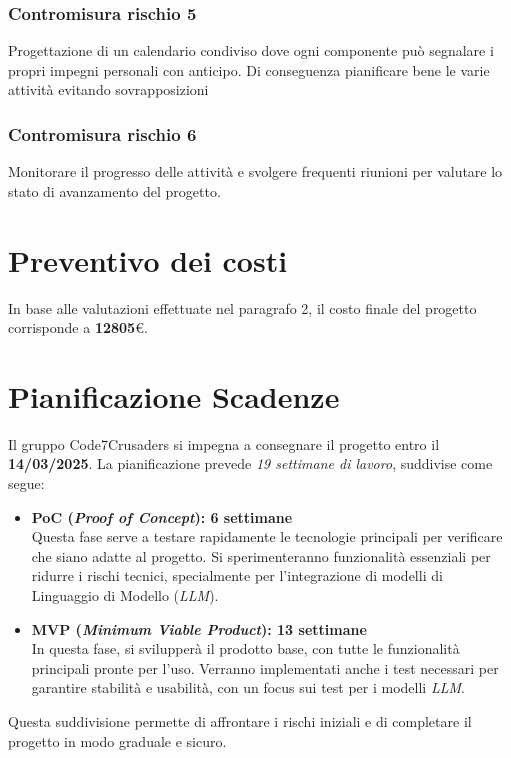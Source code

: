 \documentclass{article}
\begin{document}
\subsubsection{Contromisura rischio 5}
Progettazione di un calendario condiviso dove ogni componente può segnalare i propri impegni personali con anticipo. Di conseguenza pianificare bene le varie attività evitando sovrapposizioni
\subsubsection{Contromisura rischio 6}
Monitorare il progresso delle attività e svolgere frequenti riunioni per valutare lo stato di avanzamento del progetto. 

\newpage
\section{Preventivo dei costi}
In base alle valutazioni effettuate nel paragrafo 2, il costo finale del progetto corrisponde a \textbf{12805}\euro .

\section{Pianificazione Scadenze}
Il gruppo Code7Crusaders si impegna a consegnare il progetto entro il \textbf{14/03/2025}. La pianificazione prevede \emph{19 settimane di lavoro}, suddivise come segue:

\begin{itemize}
    \item \textbf{PoC (\textit{Proof of Concept}): 6 settimane} \\
    Questa fase serve a testare rapidamente le tecnologie principali per verificare che siano adatte al progetto. Si sperimenteranno funzionalità essenziali per ridurre i rischi tecnici, specialmente per l'integrazione di modelli di Linguaggio di Modello (\emph{LLM}).

    \item \textbf{MVP (\textit{Minimum Viable Product}): 13 settimane} \\
    In questa fase, si svilupperà il prodotto base, con tutte le funzionalità principali pronte per l’uso. Verranno implementati anche i test necessari per garantire stabilità e usabilità, con un focus sui test per i modelli \emph{LLM}.
\end{itemize}

Questa suddivisione permette di affrontare i rischi iniziali e di completare il progetto in modo graduale e sicuro.
\end{document}
